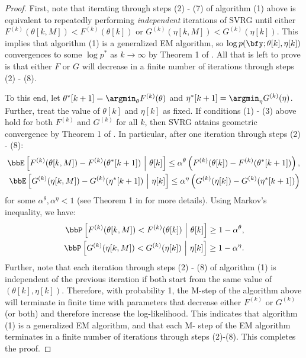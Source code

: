 \begin{proof}
First, note that iterating through steps (2) - (7) of algorithm (1) above is equivalent to repeatedly performing \textit{independent} iterations of SVRG until either $F^{(k)}(\theta[k,M]) < F^{(k)}(\theta[k])$ or $G^{(k)}(\eta[k,M]) < G^{(k)}(\eta[k])$. This implies that algorithm (1) is a generalized EM algorithm, so $\log p(\bfy ; \theta[k],\eta[k])$ convergences to some $\log p^*$ as $k \to \infty$ by Theorem 1 of \citep{Wu:1983}. All that is left to prove is that either $F$ or $G$ will decrease in a finite number of iterations through steps (2) - (8).

To this end, let $\theta^*[k+1] = \argmin_\theta F^{(k)}(\theta)$ and $\eta^*[k+1] = \argmin_\eta G^{(k)}(\eta)$. Further, treat the value of $\theta[k]$ and $\eta[k]$ as fixed. If conditions (1) - (3) above hold for both $F^{(k)}$ and $G^{(k)}$ for all $k$, then SVRG attains geometric convergence by Theorem 1 of \citet{Johnson:2013}. In particular, after one iteration through steps (2) - (8): 
%
\begin{align*}
    \bbE\left[F^{(k)}(\theta[k,M]) - F^{(k)}(\theta^*[k+1]) ~\Big\vert~ \theta[k]\right] \leq \alpha^{\theta} \left(F^{(k)}(\theta[k]) - F^{(k)}(\theta^*[k+1])\right), \\
    \bbE\left[G^{(k)}(\eta[k,M]) - G^{(k)}(\eta^*[k+1]) ~\Big\vert~ \eta[k] \right] \leq \alpha^{\eta} \left(G^{(k)}(\eta[k]) - G^{(k)}(\eta^*[k+1])\right)
\end{align*}
%
for some $\alpha^{\theta}, \alpha^{\eta} < 1$ (see Theorem 1 in \citet{Johnson:2013} for more details). Using Markov's inequality, we have:
\begin{align*}
    \bbP\left[F^{(k)}(\theta[k,M]) < F^{(k)}(\theta[k]) ~\Big\vert~ \theta[k]\right] \geq 1-\alpha^{\theta}, \\
    \bbP\left[G^{(k)}(\eta[k,M]) < G^{(k)}(\eta[k]) ~\Big\vert~ \eta[k]\right] \geq 1-\alpha^{\eta}.
\end{align*}
Further, note that each iteration through steps (2) - (8) of algorithm (1) is independent of the previous iteration if both start from the same value of $(\theta[k],\eta[k])$. Therefore, with probability 1, the M-step of the algorithm above will terminate in finite time with parameters that decrease either $F^{(k)}$ or $G^{(k)}$ (or both) and therefore increase the log-likelihood. This indicates that algorithm (1) is a generalized EM algorithm, and that each M- step of the EM algorithm terminates in a finite number of iterations through steps (2)-(8). This completes the proof.
\end{proof}

